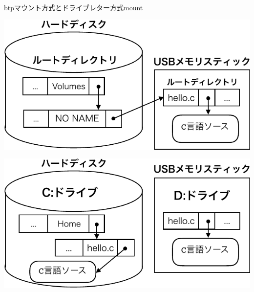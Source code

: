 \begin{myfig}{btp}{マウント方式とドライブレター方式}{mount}
    \begin{minipage}{0.49\columnwidth}
      \begin{center}
        \includegraphics[scale=0.6]{Fig/mountTree-crop.pdf}
        \label{fig:mountTree}
      \end{center}
    \end{minipage}
    \begin{minipage}{0.49\columnwidth}
      \begin{center}
        \includegraphics[scale=0.6]{Fig/mountDrive-crop.pdf}
        \label{fig:mountDrive}
      \end{center}
    \end{minipage}
\end{myfig}

